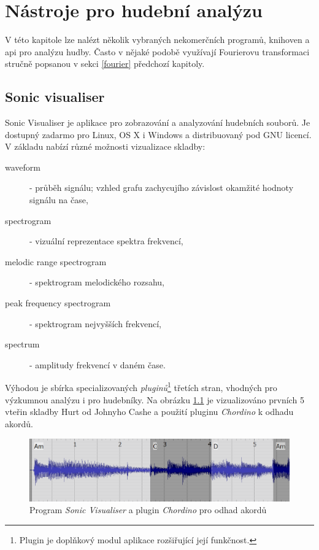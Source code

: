 \documentclass[thesis=B, czech]{FITthesis}[2019/03/06]
\begin{document}



\chapter{Nástroje pro hudební analýzu}

V této kapitole lze nalézt několik vybraných nekomerčních programů, knihoven a \gls{api} pro analýzu hudby. Často v nějaké podobě využívají Fourierovu transformaci stručně popsanou v sekci \ref{fourier} předchozí kapitoly. 


\section{Sonic visualiser}

Sonic Visualiser \cite{SonicVisualiser} je aplikace pro zobrazování a analyzování hudebních souborů. Je dostupný zadarmo pro Linux, OS X i Windows a distribuovaný pod GNU licencí. V základu nabízí různé možnosti vizualizace skladby:
\begin{description}
    \item [waveform] - průběh signálu; vzhled grafu zachycujího závislost okamžité hodnoty signálu na čase,
    \item [spectrogram] - vizuální reprezentace spektra frekvencí,
    \item [melodic range spectrogram] - spektrogram melodického rozsahu,
    \item [peak frequency spectrogram] - spektrogram nejvyšších frekvencí,
    \item [spectrum] - amplitudy frekvencí v daném čase.
\end{description}

Výhodou je sbírka specializovaných \emph{pluginů}\footnote{Plugin je doplňkový modul aplikace rozšiřující její funkčnost.} třetích stran, vhodných pro výzkumnou analýzu i pro hudebníky. Na obrázku \ref{fig:sonic} je vizualizováno prvních 5 vteřin skladby Hurt od Johnyho Cashe a použití pluginu \textit{Chordino} k odhadu akordů.


\begin{figure}[h]
  \centering
  \includegraphics[width=360pt]{images/cash_chords.png}
  \caption{Program \textit{Sonic Visualiser} a plugin \textit{Chordino} pro odhad akordů}
  \label{fig:sonic}
\end{figure}
\end{document}

